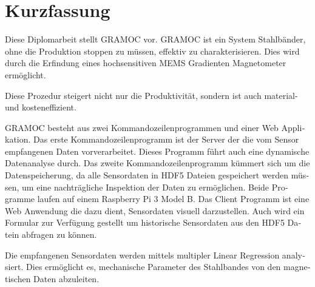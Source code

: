 \chapter{Kurzfassung}
\begin{german}

Diese Diplomarbeit stellt GRAMOC vor. GRAMOC ist ein System Stahlbänder, ohne die Produktion stoppen zu müssen, effektiv zu charakterisieren. Dies wird durch die Erfindung eines hochsensitiven MEMS Gradienten Magnetometer ermöglicht.

Diese Prozedur steigert nicht nur die Produktivität, sondern ist auch material- und kosteneffizient.

GRAMOC besteht aus zwei Kommandozeilenprogrammen und einer Web Applikation. Das erste Kommandozeilenprogramm ist der Server der die vom Sensor empfangenen Daten vorverarbeitet. Dieses Programm führt auch eine dynamische Datenanalyse durch. Das zweite Kommandozeilenprogramm kümmert sich um die Datenspeicherung, da alle Sensordaten in HDF5 Dateien gespeichert werden müssen, um eine nachträgliche Inspektion der Daten zu ermöglichen. Beide Programme laufen auf einem Raspberry Pi 3 Model B. Das Client Programm ist eine Web Anwendung die dazu dient, Sensordaten visuell darzustellen. Auch wird ein Formular zur Verfügung gestellt um historische Sensordaten aus den HDF5 Datein abfragen zu können.

Die empfangenen Sensordaten werden mittels multipler Linear Regression analysiert. Dies ermöglicht es, mechanische Parameter des Stahlbandes von den magnetischen Daten abzuleiten.

\end{german}
